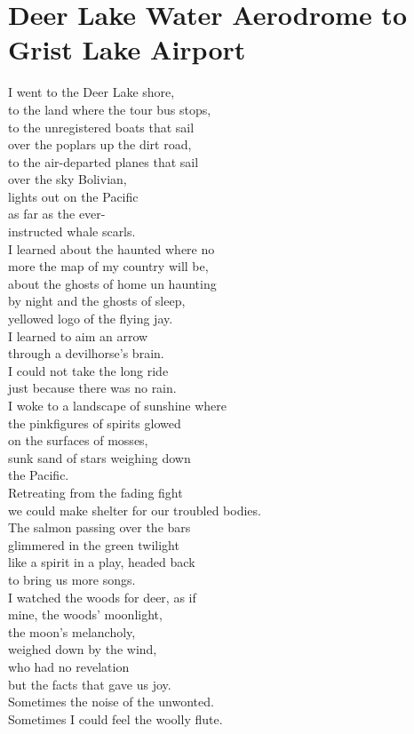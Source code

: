 \documentclass[smalldemyvopaper,11pt,twoside,onecolumn,openright,extrafontsizes]{memoir}
\begin{document}
\chapter{Deer Lake Water Aerodrome to Grist Lake Airport}
I went to the Deer Lake shore,
\\to the land where the tour bus stops,
\\to the unregistered boats that sail
\\over the poplars up the dirt road,
\\to the air-departed planes that sail
\\over the sky Bolivian,
\\lights out on the Pacific
\\as far as the ever-
\\instructed whale scarls.
\\I learned about the haunted where no
\\more the map of my country will be,
\\about the ghosts of home un haunting
\\by night and the ghosts of sleep,
\\yellowed logo of the flying jay.
\\I learned to aim an arrow
\\through a devilhorse's brain.
\\I could not take the long ride
\\just because there was no rain.
\\I woke to a landscape of sunshine where
\\the pinkfigures of spirits glowed
\\on the surfaces of mosses,
\\sunk sand of stars weighing down
\\the Pacific.
\\Retreating from the fading fight
\\we could make shelter for our troubled bodies.
\\The salmon passing over the bars
\\glimmered in the green twilight
\\like a spirit in a play, headed back
\\to bring us more songs.
\\I watched the woods for deer, as if
\\mine, the woods' moonlight,
\\the moon's melancholy,
\\weighed down by the wind,
\\who had no revelation
\\but the facts that gave us joy.
\\Sometimes the noise of the unwonted.
\\Sometimes I could feel the woolly flute.
\end{document}
